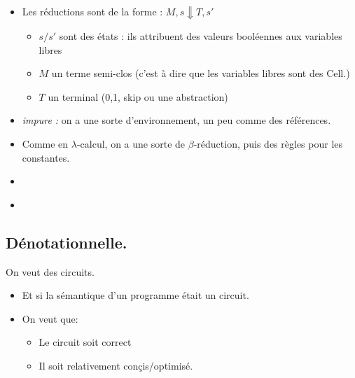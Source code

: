 \documentclass{beamer}
\begin{document}
\begin{frame}
\begin{itemize}
\item Les réductions sont de la forme : $M,s\Downarrow T,s'$
\begin{itemize}
\item $s/s'$ sont des états : ils attribuent des valeurs booléennes aux variables libres 
\item $M$ un terme semi-clos (c'est à dire que les variables libres sont des
Cell.)
\item $T$ un terminal (0,1, skip ou une abstraction)
\end{itemize}
\pause
\item \emph{impure :} on a une sorte d'environnement, un peu comme des références.
\end{itemize}
\end{frame}

\begin{frame}
\begin{itemize}
\item Comme en $\lambda$-calcul, on a une sorte de $\beta$-réduction, puis des
règles pour les constantes.
\item 
\begin{prooftree}
\end{prooftree}
\item 

\begin{prooftree}
\end{prooftree}

\end{itemize}
\end{frame}


\subsection{Dénotationnelle.}

\begin{frame}{On veut des circuits.}
\begin{itemize}
\item Et si la sémantique d'un programme était un circuit.
\item On veut que:
\begin{itemize}
\pause
\item Le circuit soit correct
\pause
\item Il soit relativement conçis/optimisé.
\end{itemize}
\end{itemize}
\end{frame}
\end{document}
